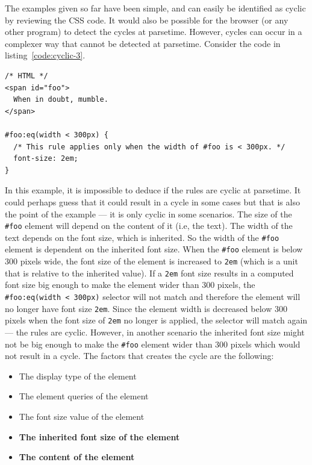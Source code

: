 \documentclass[a4paper,11pt]{kth-mag}
\newcommand{\code}[1]{\texttt{#1}}
\begin{document}
          The examples given so far have been simple, and can easily be identified as cyclic by reviewing the \gls{CSS} code.
          It would also be possible for the browser (or any other program) to detect the cycles at parsetime.
          However, cycles can occur in a complexer way that cannot be detected at parsetime.
          Consider the code in listing~\ref{code:cyclic-3}.
          \begin{lstlisting}[caption={Example of cyclic rules that cannot be detected at parsetime.}, captionpos=b, label={code:cyclic-3}]
/* HTML */
<span id="foo">
  When in doubt, mumble.
</span>

#foo:eq(width < 300px) {
  /* This rule applies only when the width of #foo is < 300px. */
  font-size: 2em;
}
          \end{lstlisting}
          In this example, it is impossible to deduce if the rules are cyclic at parsetime.
          It could perhaps guess that it could result in a cycle in some cases but that is also the point of the example --- it is only cyclic in some scenarios.
          The size of the \code{\#foo} element will depend on the content of it (i.e, the text).
          The width of the text depends on the font size, which is inherited.
          So the width of the \code{\#foo} \gls{element} is dependent on the inherited font size.
          When the \code{\#foo} \gls{element} is below 300 pixels wide, the font size of the element is increased to \code{2em} (which is a unit that is relative to the inherited value).
          If a \code{2em} font size results in a computed font size big enough to make the \gls{element} wider than 300 pixels, the \code{\#foo:eq(width < 300px)} selector will not match and therefore the element will no longer have font size \code{2em}.
          Since the element width is decreased below 300 pixels when the font size of \code{2em} no longer is applied, the selector will match again --- the rules are cyclic.
          However, in another scenario the inherited font size might not be big enough to make the \code{\#foo} element wider than 300 pixels which would not result in a cycle.
          The factors that creates the cycle are the following:
          \begin{itemize}
            \item The display type of the \gls{element}
            \item The \gls{element} queries of the \gls{element}
            \item The font size value of the \gls{element}
            \item \textbf{The inherited font size of the \gls{element}}
            \item \textbf{The content of the \gls{element}}
          \end{itemize}
\end{document}
